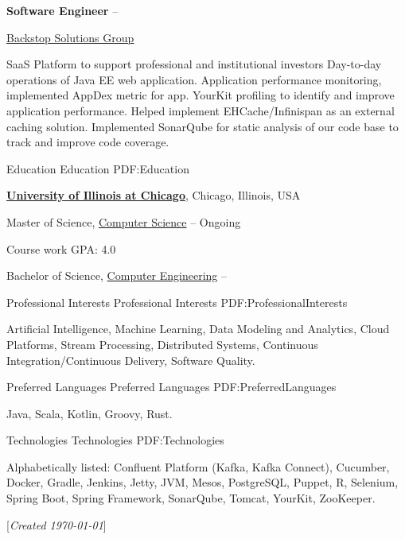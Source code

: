 \documentclass[letterpaper,MMMyyyy,nonstopmode]{simpleresumecv}
\newcommand{\CVNote}{Created {\today}}
\begin{document}
\begin{Body}
\BigGap
\Entry
\textbf{Software Engineer}
\hfill
{} -- 

\href{https://www.backstopsolutions.com}{Backstop Solutions Group}

\BigGap
\BulletItem
SaaS Platform to support professional and institutional investors
\SubBulletItem Day-to-day operations of Java EE web application.
\SubBulletItem Application performance monitoring, implemented AppDex metric for app.
\SubBulletItem YourKit profiling to identify and improve application performance.
\SubBulletItem Helped implement EHCache/Infinispan as an external caching solution.
\SubBulletItem Implemented SonarQube for static analysis of our code base to track and improve code coverage.
\BigGap


\Section
{Education}
{Education}
{PDF:Education}

\Entry
\href{https://www.cs.uic.edu}
{\textbf{University of Illinois at Chicago}},
Chicago, Illinois, USA

\Gap
\BulletItem
Master of Science,
\href{http://www.cs.uic.edu}
{Computer Science}
\hfill
{} -- Ongoing

\SubBulletItem
Course work GPA: 4.0

\Gap
\BulletItem
Bachelor of Science,
\href{http://www.ece.uic.edu}
{Computer Engineering}
\hfill
{} --

\BigGap


\Section
{Professional Interests}
{Professional Interests}
{PDF:ProfessionalInterests}

\Entry
Artificial Intelligence,
Machine Learning,
Data Modeling and Analytics,
Cloud Platforms,
Stream Processing,
Distributed Systems,
Continuous Integration/Continuous Delivery,
Software Quality.

\BigGap


\Section
{Preferred Languages}
{Preferred Languages}
{PDF:PreferredLanguages}

\Entry
Java,
Scala,
Kotlin,
Groovy,
Rust.

\BigGap


\Section
{Technologies}
{Technologies}
{PDF:Technologies}

\Entry
Alphabetically listed:\newline
Confluent Platform (Kafka, Kafka Connect),
Cucumber,
Docker,
Gradle,
Jenkins,
Jetty,
JVM,
Mesos,
PostgreSQL,
Puppet,
R,
Selenium,
Spring Boot,
Spring Framework,
SonarQube,
Tomcat,
YourKit,
ZooKeeper.
\BigGap

\end{Body}


\BigGap
\UseNoteFont%
\null\hfill%
[\textit{\CVNote}]
\end{document}
